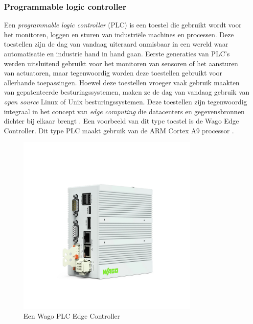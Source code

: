 \subsubsection{Programmable logic controller}
Een \textit{programmable logic controller} (PLC) is een toestel die gebruikt wordt voor het monitoren, loggen en sturen van industriële machines en processen. Deze toestellen zijn de dag van vandaag uiteraard onmisbaar in een wereld waar automatisatie en industrie hand in hand gaan. Eerste generaties van PLC’s werden uitsluitend gebruikt voor het monitoren van sensoren of het aansturen van actuatoren, maar tegenwoordig worden deze toestellen gebruikt voor allerhande toepassingen. Hoewel deze toestellen vroeger vaak gebruik maakten van gepatenteerde besturingssystemen, maken ze de dag van vandaag gebruik van \textit{open source} Linux of Unix besturingssystemen. Deze toestellen zijn tegenwoordig integraal in het concept van \textit{edge computing} die datacenters en gegevensbronnen dichter bij elkaar brengt \autocite{DeCraeke2022}. Een voorbeeld van dit type toestel is de Wago Edge Controller. Dit type PLC maakt gebruik van de ARM Cortex A9 processor \autocite{Wago2022}.

\begin{figure}[!h]
	\centering
	\includegraphics[width=90mm, scale=0.5]{img/wago_edge_controller.jpg}
	\caption{Een Wago PLC Edge Controller \autocite{Wago2022}}
\end{figure}
